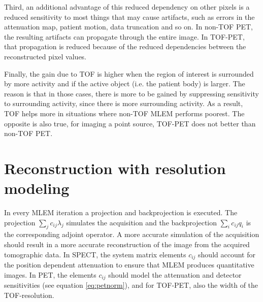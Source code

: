 Third, an additional advantage of this reduced dependency on other
pixels is a reduced sensitivity to most things that may cause
artifacts, such as errors in the attenuation map, patient motion, data
truncation and so on. In non-TOF PET, the resulting artifacts can
propagate through the entire image. In TOF-PET, that propagation is
reduced because of the reduced dependencies between the reconstructed
pixel values.

Finally, the gain due to TOF is higher when the region of interest is
surrounded by more activity and if the active object (i.e. the patient
body) is larger. The reason is that in those cases, there is more to
be gained by suppressing sensitivity to surrounding activity, since
there is more surrounding activity. As a result, TOF helps more in
situations where non-TOF MLEM performs poorest. The opposite is also
true, for imaging a point source, TOF-PET does not better than non-TOF
PET.

\section{Reconstruction with resolution modeling} \label{sec:resol}
In every MLEM iteration a projection and backprojection is
executed. The projection $\sum_j c_{ij} \lambda_j$ simulates the
acquisition and the backprojection $\sum_i c_{ij} q_i$ is the
corresponding adjoint operator. A more accurate simulation of the
acquisition should result in a more accurate reconstruction of the
image from the acquired tomographic data. In SPECT, the system matrix
elements $c_{ij}$ should account for the position dependent
attenuation to ensure that MLEM produces quantitative images. In PET,
the elements $c_{ij}$ should model the attenuation and detector
sensitivities (see equation \ref{eq:petnorm}), and for TOF-PET, also
the width of the TOF-resolution.


